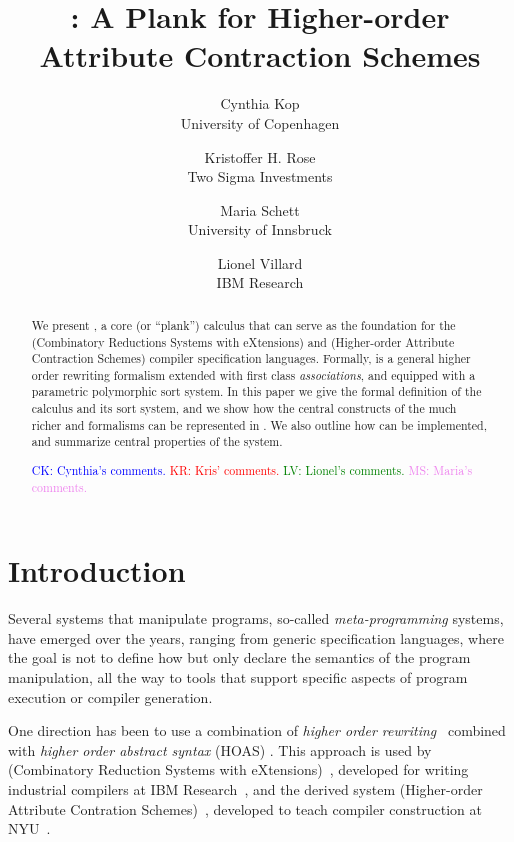 \documentclass[letterpaper,11pt]{article}
\title{ \hax: A Plank for Higher-order Attribute Contraction Schemes }
\author{%
  Cynthia Kop \\
 University of Copenhagen
 \and
 Kristoffer H. Rose \\
 Two Sigma Investments
 \and
 Maria Schett \\
 University of Innsbruck
 \and
 Lionel Villard \\
 IBM Research
}
\newcommand{\CK}[1]{\textcolor{blue}{CK: #1}}
\newcommand{\KR}[1]{\textcolor{red}{KR: #1}}
\newcommand{\LV}[1]{\textcolor{green}{LV: #1}}
\newcommand{\MS}[1]{\textcolor{violet}{MS: #1}}
\begin{document}
\maketitle

\begin{abstract}\noindent
  We present \hax, a core (or ``plank'') calculus that can serve as the foundation for the \CRSX
  (Combinatory Reductions Systems with eXtensions) and \HAX (Higher-order Attribute Contraction
  Schemes) compiler specification languages.
  Formally, \hax is a general higher order rewriting formalism extended with first class
  \emph{associations}, and equipped with a parametric polymorphic sort system.
  In this paper we give the formal definition of the \hax calculus and its sort system, and we show
  how the central constructs of the much richer \HAX and \CRSX formalisms can be represented in
  \hax. We also outline how \hax can be implemented, and summarize central properties of the system.

  \CK{Cynthia's comments.} \KR{Kris' comments.} \LV{Lionel's comments.} \MS{Maria's comments.}
\end{abstract}

\compacttableofcontents


\section{Introduction}\label{sec:intro}

Several systems that manipulate programs, so-called \emph{meta-programming} systems, have emerged
over the years, ranging from generic specification languages, where the goal is not to define how
but only declare the semantics of the program manipulation, all the way to tools that support
specific aspects of program execution or compiler generation.

One direction has been to use a combination of \emph{higher order
  rewriting}~\cite{Jouannaud:klop2005} combined with \emph{higher order abstract syntax} (HOAS)
\cite{PfenningElliot:pldi1988}. This approach is used by \CRSX (Combinatory Reduction Systems with
eXtensions)~\cite{Rose:1996}, developed for writing industrial compilers at IBM
Research~\cite{Rose:hor2010,Rose:rta2011,dp60:ibm2013}, and the derived system \HAX (Higher-order
Attribute Contration Schemes)~\cite{Rose:ts2015}, developed to teach compiler construction at
NYU~\cite{RoseRose:cims2015}.
\end{document}
